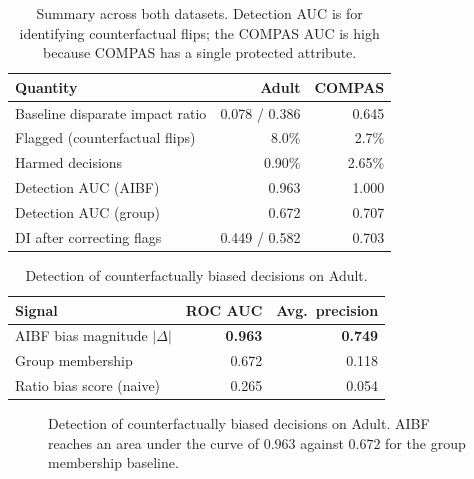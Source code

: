 \documentclass[conference]{IEEEtran}
\begin{document}
\begin{table}[t]
\caption{Summary across both datasets. Detection AUC is for identifying counterfactual
flips; the COMPAS AUC is high because COMPAS has a single protected attribute.}
\label{tab:compas}
\centering
\footnotesize
\begin{tabular}{@{}lrr@{}}
\toprule
Quantity & Adult & COMPAS \\
\midrule
Baseline disparate impact ratio & 0.078 / 0.386 & 0.645 \\
Flagged (counterfactual flips)  & 8.0\%  & 2.7\% \\
Harmed decisions                & 0.90\% & 2.65\% \\
Detection AUC (AIBF)            & 0.963 & 1.000 \\
Detection AUC (group)          & 0.672 & 0.707 \\
DI after correcting flags       & 0.449 / 0.582 & 0.703 \\
\bottomrule
\end{tabular}
\end{table}

\begin{table}[t]
\caption{Detection of counterfactually biased decisions on Adult.}
\label{tab:auc}
\centering
\footnotesize
\begin{tabular}{@{}lrr@{}}
\toprule
Signal & ROC AUC & Avg.\ precision \\
\midrule
AIBF bias magnitude $|\Delta|$   & \textbf{0.963} & \textbf{0.749} \\
Group membership                 & 0.672 & 0.118 \\
Ratio bias score (naive)         & 0.265 & 0.054 \\
\bottomrule
\end{tabular}
\end{table}

\begin{figure}[t]
\centering
{}
\caption{Detection of counterfactually biased decisions on Adult. AIBF reaches an
area under the curve of $0.963$ against $0.672$ for the group membership baseline.}
\label{fig:roc}
\end{figure}
\end{document}
